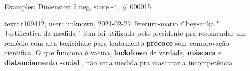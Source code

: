 \begin{frame}{Examples: Dimension 5 neg, score -4, \# 000015}
\footnotesize
\begin{alertblock}{text: t109412, user: unknown, 2021-02-27}
@return-mario @hey-mika " Justificativa da medida " tbm foi utilizada pelo 
presidente pra recomendar um remédio com alta toxicidade para tratamento 
\textbf{precoce} sem comprovação cientifica. O que funciona é vacina, 
\textbf{lockdown} de verdade, \textbf{máscara} e \textbf{distanciamento} 
\textbf{social} , não uma medida pra mascarar a incompetência 
\end{alertblock}
\end{frame}
